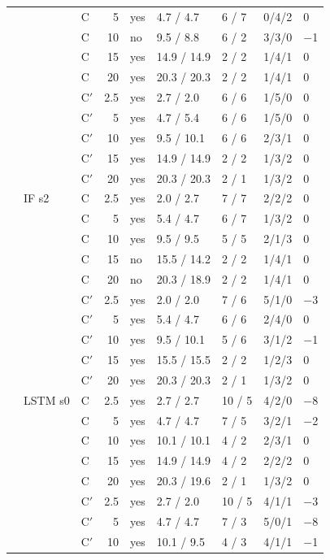 \begin{scriptsize}
\begin{longtable}{lllrlllll}
 &  & C & 5 & yes & 4.7 / 4.7 & 6 / 7 & 0/4/2 & 0 \\
 &  & C & 10 & no & 9.5 / 8.8 & 6 / 2 & 3/3/0 & $-$1 \\
 &  & C & 15 & yes & 14.9 / 14.9 & 2 / 2 & 1/4/1 & 0 \\
 &  & C & 20 & yes & 20.3 / 20.3 & 2 / 2 & 1/4/1 & 0 \\
 &  & C$'$ & 2.5 & yes & 2.7 / 2.0 & 6 / 6 & 1/5/0 & 0 \\
 &  & C$'$ & 5 & yes & 4.7 / 5.4 & 6 / 6 & 1/5/0 & 0 \\
 &  & C$'$ & 10 & yes & 9.5 / 10.1 & 6 / 6 & 2/3/1 & 0 \\
 &  & C$'$ & 15 & yes & 14.9 / 14.9 & 2 / 2 & 1/3/2 & 0 \\
 &  & C$'$ & 20 & yes & 20.3 / 20.3 & 2 / 1 & 1/3/2 & 0 \\
 & IF s2 & C & 2.5 & yes & 2.0 / 2.7 & 7 / 7 & 2/2/2 & 0 \\
 &  & C & 5 & yes & 5.4 / 4.7 & 6 / 7 & 1/3/2 & 0 \\
 &  & C & 10 & yes & 9.5 / 9.5 & 5 / 5 & 2/1/3 & 0 \\
 &  & C & 15 & no & 15.5 / 14.2 & 2 / 2 & 1/4/1 & 0 \\
 &  & C & 20 & no & 20.3 / 18.9 & 2 / 2 & 1/4/1 & 0 \\
 &  & C$'$ & 2.5 & yes & 2.0 / 2.0 & 7 / 6 & 5/1/0 & $-$3 \\
 &  & C$'$ & 5 & yes & 5.4 / 4.7 & 6 / 6 & 2/4/0 & 0 \\
 &  & C$'$ & 10 & yes & 9.5 / 10.1 & 5 / 6 & 3/1/2 & $-$1 \\
 &  & C$'$ & 15 & yes & 15.5 / 15.5 & 2 / 2 & 1/2/3 & 0 \\
 &  & C$'$ & 20 & yes & 20.3 / 20.3 & 2 / 1 & 1/3/2 & 0 \\
 & LSTM s0 & C & 2.5 & yes & 2.7 / 2.7 & 10 / 5 & 4/2/0 & $-$8 \\
 &  & C & 5 & yes & 4.7 / 4.7 & 7 / 5 & 3/2/1 & $-$2 \\
 &  & C & 10 & yes & 10.1 / 10.1 & 4 / 2 & 2/3/1 & 0 \\
 &  & C & 15 & yes & 14.9 / 14.9 & 4 / 2 & 2/2/2 & 0 \\
 &  & C & 20 & yes & 20.3 / 19.6 & 2 / 1 & 1/3/2 & 0 \\
 &  & C$'$ & 2.5 & yes & 2.7 / 2.0 & 10 / 5 & 4/1/1 & $-$3 \\
 &  & C$'$ & 5 & yes & 4.7 / 4.7 & 7 / 3 & 5/0/1 & $-$8 \\
 &  & C$'$ & 10 & yes & 10.1 / 9.5 & 4 / 3 & 4/1/1 & $-$1 \\

\end{longtable}
\end{scriptsize}
